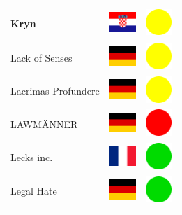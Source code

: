 \documentclass[12pt, a4paper, twoside]{report}
\begin{document}
\begin{center}
\begin{longtable}{|p{5cm}|p{2cm}|p{2cm}|}
 Kryn                                                       & \includegraphics[width=1cm]{../4x3/hr} &   \includegraphics[width=1cm]{../likes/m} \\ \hline
 Lack of Senses                                             & \includegraphics[width=1cm]{../4x3/de} &   \includegraphics[width=1cm]{../likes/m} \\ \hline
 Lacrimas Profundere                                        & \includegraphics[width=1cm]{../4x3/de} &   \includegraphics[width=1cm]{../likes/m} \\ \hline
 LAWMÄNNER                                                  & \includegraphics[width=1cm]{../4x3/de} &   \includegraphics[width=1cm]{../likes/n} \\ \hline
 Lecks inc.                                                 & \includegraphics[width=1cm]{../4x3/fr} &   \includegraphics[width=1cm]{../likes/y} \\ \hline
 Legal Hate                                                 & \includegraphics[width=1cm]{../4x3/de} &   \includegraphics[width=1cm]{../likes/y} \\ \hline

\end{longtable}
\end{center}
\end{document}
